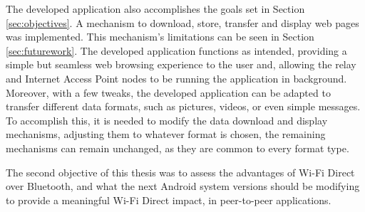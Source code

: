 The developed application also accomplishes the goals set in Section \ref{sec:objectives}. A mechanism to download, store, transfer and display web pages was implemented. This mechanism's limitations can be seen in Section \ref{sec:futurework}. The developed application functions as intended, providing a simple but seamless web browsing experience to the user and, allowing the relay and Internet Access Point nodes to be running the application in background.  Moreover, with a few tweaks, the developed application can be adapted to transfer different data formats, such as pictures, videos, or even simple messages. To accomplish this, it is needed to modify the data download and display mechanisms, adjusting them to whatever format is chosen, the remaining mechanisms can remain unchanged, as they are common to every format type.

The second objective of this thesis was to assess the advantages of Wi-Fi Direct over Bluetooth, and what the next Android system versions should be modifying to provide a meaningful Wi-Fi Direct impact, in peer-to-peer applications. 




